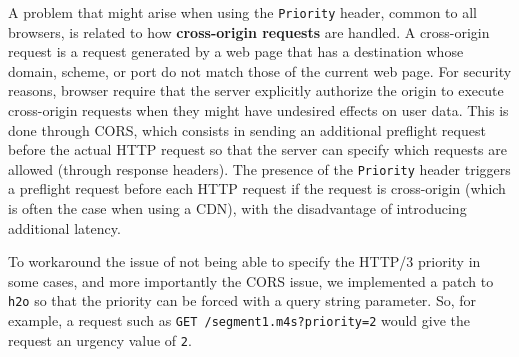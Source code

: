 A problem that might arise when using the \texttt{Priority} header, common to all browsers, is related to how \textbf{cross-origin requests} are handled. A cross-origin request is a request generated by a web page that has a destination whose domain, scheme, or port do not match those of the current web page. For security reasons, browser require that the server explicitly authorize the origin to execute cross-origin requests when they might have undesired effects on user data. This is done through CORS, which consists in sending an additional preflight request before the actual HTTP request so that the server can specify which requests are allowed (through response headers). The presence of the \texttt{Priority} header triggers a preflight request before each HTTP request if the request is cross-origin (which is often the case when using a CDN), with the disadvantage of introducing additional latency.

To workaround the issue of not being able to specify the HTTP/3 priority in some cases, and more importantly the CORS issue, we implemented a patch to \texttt{h2o} so that the priority can be forced with a query string parameter. So, for example, a request such as \texttt{GET /segment1.m4s?priority=2} would give the request an urgency value of \texttt{2}.









